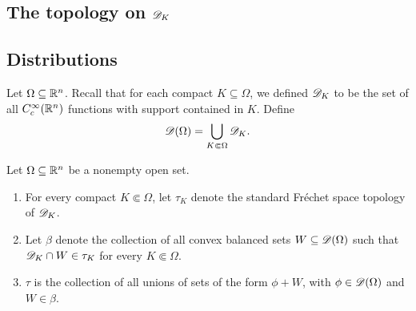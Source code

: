 \subsection{The topology on \texorpdfstring{$\mathscr{D}_K$}{DK}}




\subsection{Distributions}
Let $\Omega\subseteq\mathbb{R}^n$. Recall that for each compact $K\subseteq\Omega$, we defined $\mathscr{D}_K$ to be the set of all $C_c^\infty(\mathbb{R}^n)$ functions with support contained in $K$. Define 
\begin{equation*}
    \mathscr{D}(\Omega) = \bigcup_{K\Subset\Omega}\mathscr{D}_K.
\end{equation*}

\begin{definition}
    Let $\Omega\subseteq\mathbb{R}^n$ be a nonempty open set.
    \begin{enumerate}[label=(\alph*)]
        \item For every compact $K\Subset\Omega$, let $\tau_K$ denote the standard Fr\'echet space topology of $\mathscr{D}_K$. 
        \item Let $\beta$ denote the collection of all convex balanced sets $W\subseteq\mathscr{D}(\Omega)$ such that $\mathscr{D}_K\cap W\in\tau_K$ for every $K\Subset\Omega$.
        \item $\tau$ is the collection of all unions of sets of the form $\phi + W$, with $\phi\in\mathscr{D}(\Omega)$ and $W\in\beta$.
    \end{enumerate}
\end{definition}

